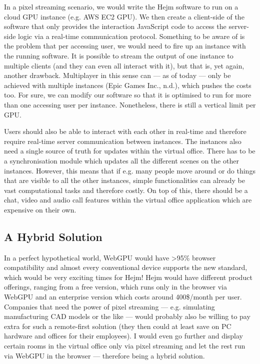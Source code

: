 \documentclass[10pt]{article}
\begin{document}
\begin{sloppypar}
  In a pixel streaming scenario, we would write the Hejm software to run on a cloud GPU instance (e.g. AWS EC2 GPU). We then create a client-side of the software that only provides the interaction JavaScript code to access the server-side logic via a real-time communication protocol. Something to be aware of is the problem that per accessing user, we would need to fire up an instance with the running software. It is possible to stream the output of one instance to multiple clients (and they can even all interact with it), but that is, yet again, another drawback. Multiplayer in this sense can — as of today — only be achieved with multiple instances (Epic Games Inc., n.d.), which pushes the costs too. For sure, we can modify our software so that it is optimised to run for more than one accessing user per instance. Nonetheless, there is still a vertical limit per GPU.

  Users should also be able to interact with each other in real-time and therefore require real-time server communication between instances. The instances also need a single source of truth for updates within the virtual office. There has to be a synchronisation module which updates all the different scenes on the other instances. However, this means that if e.g. many people move around or do things that are visible to all the other instances, simple functionalities can already be vast computational tasks and therefore costly. On top of this, there should be a chat, video and audio call features within the virtual office application which are expensive on their own.

  \subsection{A Hybrid Solution}
  \label{subsec:a-hybrid-solution}

  In a perfect hypothetical world, WebGPU would have >95\% browser compatibility and almost every conventional device supports the new standard, which would be very exciting times for Hejm! Hejm would have different product offerings, ranging from a free version, which runs only in the browser via WebGPU and an enterprise version which costs around 400\$/month per user. Companies that need the power of pixel streaming — e.g. simulating manufacturing CAD models or the like — would probably also be willing to pay extra for such a remote-first solution (they then could at least save on PC hardware and offices for their employees). I would even go further and display certain rooms in the virtual office only via pixel streaming and let the rest run via WebGPU in the browser — therefore being a hybrid solution.


\end{sloppypar}
\end{document}
